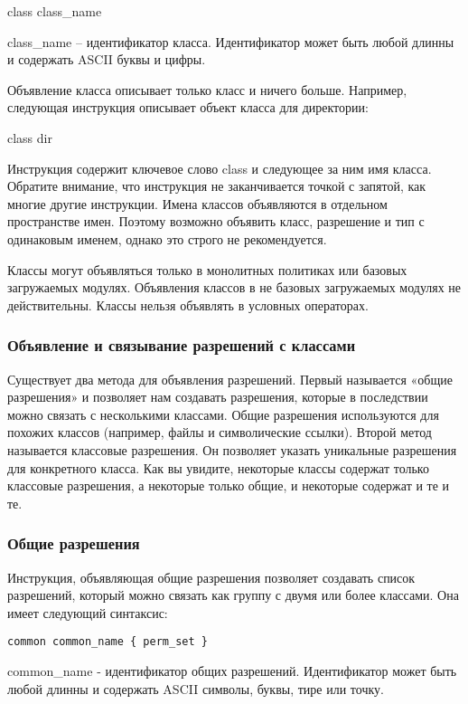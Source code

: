 \documentclass{./../class/UIR}
\begin{document}
class class\_name 

class\_name – идентификатор класса. Идентификатор может быть
любой длинны и содержать ASCII буквы и цифры.

Объявление класса описывает только класс и ничего больше. Например, следующая
инструкция описывает объект класса для директории:

class dir 

Инструкция содержит ключевое слово class и следующее за ним имя
класса. Обратите внимание, что инструкция не заканчивается точкой с запятой, как
многие другие инструкции. Имена классов объявляются в отдельном пространстве
имен. Поэтому возможно объявить класс, разрешение и тип с одинаковым именем,
однако это строго не рекомендуется.

Классы могут объявляться только в монолитных политиках или базовых загружаемых
модулях. Объявления классов в не базовых загружаемых модулях не действительны.
Классы нельзя объявлять в условных операторах.
    
    \subsubsection{Объявление и связывание разрешений с классами}
    
    Существует два метода для объявления разрешений. Первый называется «общие
    разрешения» и позволяет нам создавать разрешения, которые в последствии
    можно связать с несколькими классами. Общие разрешения используются для
    похожих классов (например, файлы и символические ссылки). Второй метод
    называется классовые разрешения. Он позволяет указать уникальные разрешения
    для конкретного класса. Как вы увидите, некоторые классы содержат только
    классовые разрешения, а некоторые только общие, и некоторые содержат и те и
    те.
    
    \subsubsection{Общие разрешения}
    Инструкция, объявляющая общие разрешения позволяет создавать список
    разрешений, который можно связать как группу с двумя или более классами. Она
    имеет следующий синтаксис:
\begin{verbatim}
common common_name { perm_set }
\end{verbatim}
common\_name  - идентификатор общих разрешений. Идентификатор может быть любой
длинны и содержать ASCII символы, буквы, тире или точку.
\end{document}

